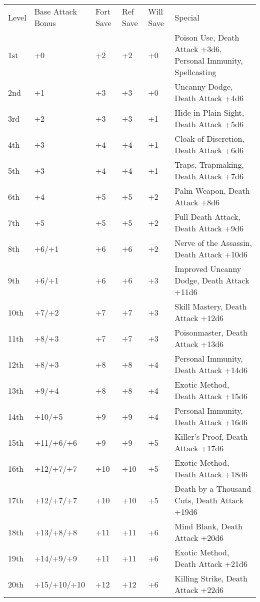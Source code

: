 \begin{table}[htb]
\begin{small}
\begin{tabular}{lp{1.9cm}p{0.7cm}p{0.7cm}p{0.7cm}l}
Level  &Base Attack Bonus &Fort Save &Ref Save &Will Save &Special\\
1st &+0 &+2 &+2 &+0 &Poison Use, Death Attack +3d6, Personal Immunity, Spellcasting\\
2nd &+1 &+3 &+3 &+0 &Uncanny Dodge, Death Attack +4d6\\
3rd &+2 &+3 &+3 &+1 &Hide in Plain Sight, Death Attack +5d6\\
4th &+3 &+4 &+4 &+1 &Cloak of Discretion, Death Attack +6d6\\
5th &+3 &+4 &+4 &+1 &Traps, Trapmaking, Death Attack +7d6\\
6th &+4 &+5 &+5 &+2 &Palm Weapon, Death Attack +8d6\\
7th &+5 &+5 &+5 &+2 &Full Death Attack, Death Attack +9d6\\
8th &+6/+1 &+6 &+6 &+2 &Nerve of the Assassin, Death Attack +10d6\\
9th &+6/+1 &+6 &+6 &+3 &Improved Uncanny Dodge, Death Attack +11d6\\
10th &+7/+2 &+7 &+7 &+3 &Skill Mastery, Death Attack +12d6\\
11th &+8/+3 &+7 &+7 &+3 &Poisonmaster, Death Attack +13d6\\
12th &+8/+3 &+8 &+8 &+4 &Personal Immunity, Death Attack +14d6\\
13th &+9/+4 &+8 &+8 &+4 &Exotic Method, Death Attack +15d6\\
14th &+10/+5 &+9 &+9 &+4 &Personal Immunity, Death Attack +16d6\\
15th &+11/+6/+6 &+9 &+9 &+5 &Killer's Proof, Death Attack +17d6\\
16th &+12/+7/+7 &+10 &+10 &+5 &Exotic Method, Death Attack +18d6\\
17th &+12/+7/+7 &+10 &+10 &+5 &Death by a Thousand Cuts, Death Attack +19d6\\
18th &+13/+8/+8 &+11 &+11 &+6 &Mind Blank, Death Attack +20d6\\
19th &+14/+9/+9 &+11 &+11 &+6 &Exotic Method, Death Attack +21d6\\
20th &+15/+10/+10 &+12 &+12 &+6 &Killing Strike, Death Attack +22d6\\
\end{tabular}
\end{small}
\end{table}

